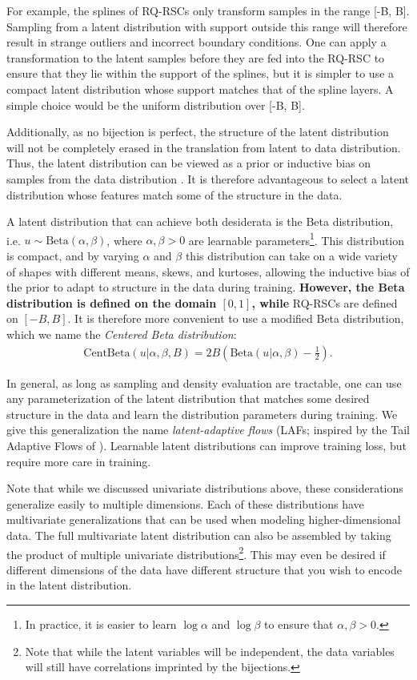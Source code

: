 \documentclass[twocolumn,twocolappendix]{aastex631}
\begin{document}
For example, the splines of RQ-RSCs only transform samples in the range [-B, B].
Sampling from a latent distribution with support outside this range will therefore result in strange outliers and incorrect boundary conditions.
One can apply a transformation to the latent samples before they are fed into the RQ-RSC to ensure that they lie within the support of the splines, but it is simpler to use a compact latent distribution whose support matches that of the spline layers.
A simple choice would be the uniform distribution over [-B, B].

Additionally, as no bijection is perfect, the structure of the latent distribution will not be completely erased in the translation from latent to data distribution.
Thus, the latent distribution can be viewed as a prior or inductive bias on samples from the data distribution \citep{jaini2020}.
It is therefore advantageous to select a latent distribution whose features match some of the structure in the data.

A latent distribution that can achieve both desiderata is the Beta distribution, i.e. $u \sim \mathrm{Beta}(\alpha, \beta)$, where $\alpha, \beta > 0$ are learnable parameters\footnote{In practice, it is easier to learn $\log\alpha$ and $\log\beta$ to ensure that $\alpha, \beta > 0$.}.
This distribution is compact, and by varying $\alpha$ and $\beta$ this distribution can take on a wide variety of shapes with different means, skews, and kurtoses, allowing the inductive bias of the prior to adapt to structure in the data during training.
\textbf{However, the Beta distribution is defined on the domain $[0, 1]$, while} RQ-RSCs are defined on $[-B, B]$.
It is therefore more convenient to use a modified Beta distribution, which we name the \emph{Centered Beta distribution}:
\begin{align}
    \text{CentBeta}(u | \alpha, \beta, B) = 2B\left(\text{Beta}(u|\alpha, \beta) - \frac{1}{2}\right).
\end{align}

In general, as long as sampling and density evaluation are tractable, one can use any parameterization of the latent distribution that matches some desired structure in the data and learn the distribution parameters during training.
We give this generalization the name \emph{latent-adaptive flows} (LAFs; inspired by the Tail Adaptive Flows of \citealt{jaini2020}).
Learnable latent distributions can improve training loss, but require more care in training.

Note that while we discussed univariate distributions above, these considerations generalize easily to multiple dimensions.
Each of these distributions have multivariate generalizations that can be used when modeling higher-dimensional data.
The full multivariate latent distribution can also be assembled by taking the product of multiple univariate distributions\footnote{Note that while the latent variables will be independent, the data variables will still have correlations imprinted by the bijections.}.
This may even be desired if different dimensions of the data have different structure that you wish to encode in the latent distribution.
\end{document}
